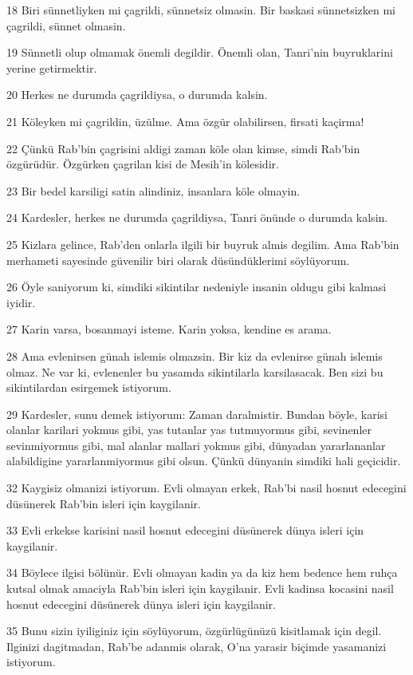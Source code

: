 \par 18 Biri sünnetliyken mi çagrildi, sünnetsiz olmasin. Bir baskasi sünnetsizken mi çagrildi, sünnet olmasin.
\par 19 Sünnetli olup olmamak önemli degildir. Önemli olan, Tanri'nin buyruklarini yerine getirmektir.
\par 20 Herkes ne durumda çagrildiysa, o durumda kalsin.
\par 21 Köleyken mi çagrildin, üzülme. Ama özgür olabilirsen, firsati kaçirma!
\par 22 Çünkü Rab'bin çagrisini aldigi zaman köle olan kimse, simdi Rab'bin özgürüdür. Özgürken çagrilan kisi de Mesih'in kölesidir.
\par 23 Bir bedel karsiligi satin alindiniz, insanlara köle olmayin.
\par 24 Kardesler, herkes ne durumda çagrildiysa, Tanri önünde o durumda kalsin.
\par 25 Kizlara gelince, Rab'den onlarla ilgili bir buyruk almis degilim. Ama Rab'bin merhameti sayesinde güvenilir biri olarak düsündüklerimi söylüyorum.
\par 26 Öyle saniyorum ki, simdiki sikintilar nedeniyle insanin oldugu gibi kalmasi iyidir.
\par 27 Karin varsa, bosanmayi isteme. Karin yoksa, kendine es arama.
\par 28 Ama evlenirsen günah islemis olmazsin. Bir kiz da evlenirse günah islemis olmaz. Ne var ki, evlenenler bu yasamda sikintilarla karsilasacak. Ben sizi bu sikintilardan esirgemek istiyorum.
\par 29 Kardesler, sunu demek istiyorum: Zaman daralmistir. Bundan böyle, karisi olanlar karilari yokmus gibi, yas tutanlar yas tutmuyormus gibi, sevinenler sevinmiyormus gibi, mal alanlar mallari yokmus gibi, dünyadan yararlananlar alabildigine yararlanmiyormus gibi olsun. Çünkü dünyanin simdiki hali geçicidir.
\par 32 Kaygisiz olmanizi istiyorum. Evli olmayan erkek, Rab'bi nasil hosnut edecegini düsünerek Rab'bin isleri için kaygilanir.
\par 33 Evli erkekse karisini nasil hosnut edecegini düsünerek dünya isleri için kaygilanir.
\par 34 Böylece ilgisi bölünür. Evli olmayan kadin ya da kiz hem bedence hem ruhça kutsal olmak amaciyla Rab'bin isleri için kaygilanir. Evli kadinsa kocasini nasil hosnut edecegini düsünerek dünya isleri için kaygilanir.
\par 35 Bunu sizin iyiliginiz için söylüyorum, özgürlügünüzü kisitlamak için degil. Ilginizi dagitmadan, Rab'be adanmis olarak, O'na yarasir biçimde yasamanizi istiyorum.
